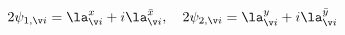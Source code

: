 \begin{equation}
2 \psi_{1,\v i} = \la^{x}_{\v i} +i\la^{\bar x}_{\v i}, \ \ \
2 \psi_{2,\v i} = \la^{y}_{\v i} +i\la^{\bar y}_{\v i}
\end{equation}

